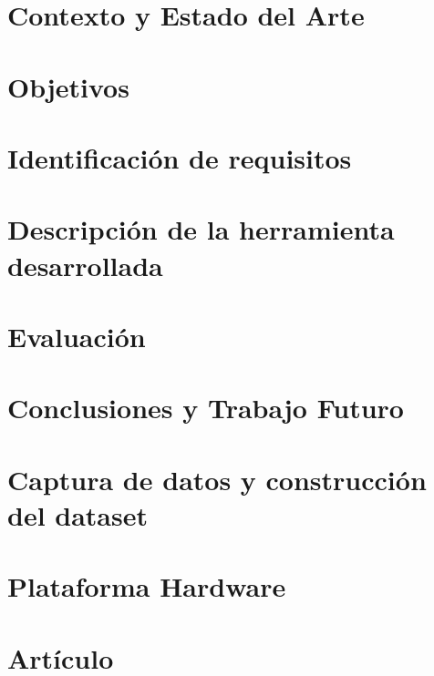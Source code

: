 \documentclass[11pt,a4paper,spanish]{book}
\begin{document}
\chapter{Contexto y Estado del Arte}\label{chap:stateofart}


\chapter{Objetivos}\label{chap:objetivos}


\chapter{Identificación de requisitos}\label{chap:requisitos}


\chapter{Descripción de la herramienta desarrollada}\label{chap:descripcion}


\chapter{Evaluación}\label{chap:eval}


\chapter{Conclusiones y Trabajo Futuro}\label{chap:conclusiones}


%




\appendix

\chapter{Captura de datos y construcción del dataset}\label{app:dataset}


\chapter{Plataforma Hardware}\label{app:plataforma}


\chapter{Artículo}

\newpage
\end{document}
